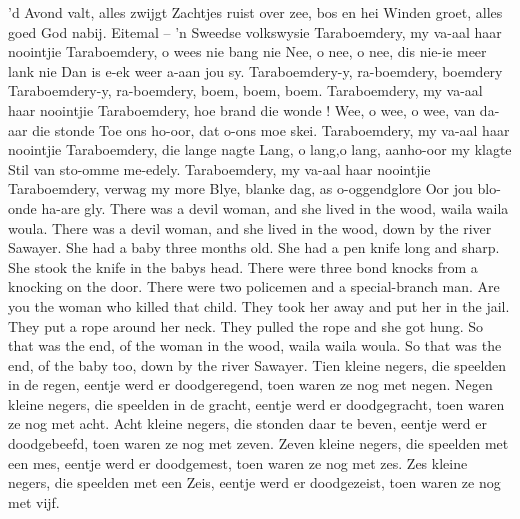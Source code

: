 \documentclass{article}
\begin{document}
\begin{songs}{}
'd Avond valt, alles zwijgt
Zachtjes ruist over zee, bos en hei
Winden groet, alles goed
God nabij. 
\endverse
\endsong
{}
\beginverse*
Eitemal – 'n Sweedse volkswysie
\endverse
\beginverse*
Taraboemdery, my va-aal haar noointjie
Taraboemdery, o wees nie bang nie
Nee, o nee, o nee, dis nie-ie meer lank nie
Dan is e-ek weer a-aan jou sy.
\endverse
\beginchorus
Taraboemdery-y, ra-boemdery, boemdery
Taraboemdery-y, ra-boemdery, boem, boem, boem.
\endchorus
\beginverse*
Taraboemdery, my va-aal haar noointjie
Taraboemdery, hoe brand die wonde !
Wee, o wee, o wee, van da-aar die stonde
Toe ons ho-oor, dat o-ons moe skei.
\endverse
\beginverse*
Taraboemdery, my va-aal haar noointjie
Taraboemdery, die lange nagte
Lang, o lang,o lang, aanho-oor my klagte
Stil van sto-omme me-edely.
\endverse
\beginverse*
Taraboemdery, my va-aal haar noointjie
Taraboemdery, verwag my more
Blye, blanke dag, as o-oggendglore
Oor jou blo-onde ha-are gly.
\endverse
\endsong 
{}
\beginverse*
There was a devil woman, 
and she lived in the wood,
waila waila woula.
There was a devil woman,
and she lived in the wood,
down by the river Sawayer.
\endverse
\beginverse*
She had a baby three months old.
\endverse
\beginverse*
She had a pen knife long and sharp.
\endverse
\beginverse*
She stook the knife in the babys head.
\endverse
\beginverse*
There were three bond knocks from a knocking on the door.
\endverse
\beginverse*
There were two policemen and a special-branch man.
\endverse
\beginverse*
Are you the woman who killed that child.
\endverse
\beginverse*
They took her away and put her in the jail.
\endverse
\beginverse*
They put a rope around her neck.
\endverse
\beginverse*
They pulled the rope and she got hung.
\endverse
\beginverse*
So that was the end,
of the woman in the wood,
waila waila woula.
So that was the end,
of the baby too,
down by the river Sawayer.
\endverse
\endsong
{}
\beginverse*
Tien kleine negers,
die speelden in de regen,
eentje werd er doodgeregend,
toen waren ze nog met negen.
\endverse
\beginverse*
Negen kleine negers,
die speelden in de gracht,
eentje werd er doodgegracht,
toen waren ze nog met acht.
\endverse
\beginverse*
Acht kleine negers,
die stonden daar te beven,
eentje werd er doodgebeefd,
toen waren ze nog met zeven.
\endverse
\beginverse*
Zeven kleine negers,
die speelden met een mes,
eentje werd er doodgemest,
toen waren ze nog met zes.
\endverse
\beginverse*
Zes kleine negers,
die speelden met een Zeis,
eentje werd er doodgezeist,
toen waren ze nog met vijf.
\endverse
\beginverse*

\end{songs}
\end{document}
